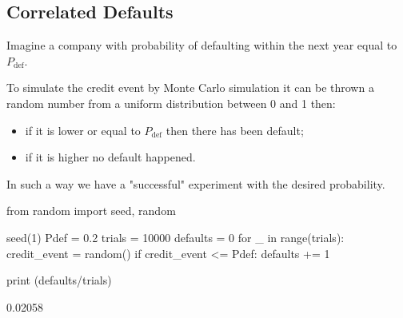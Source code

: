 



    


\subsection{Correlated Defaults}

Imagine a company with probability of defaulting within the next year equal to $P_{\mathrm{def}}$.

To simulate the credit event by Monte Carlo simulation it can be thrown a random number from a uniform distribution between 0 and 1  then:
\begin{itemize}
\item if it is lower or equal to $P_{\mathrm{def}}$ then there has been default;
\item if it is higher no default happened.
\end{itemize}

In such a way we have a "successful" experiment with the desired probability.

\begin{ipython}
from random import seed, random

seed(1)
Pdef = 0.2
trials = 10000
defaults = 0
for _ in range(trials):
    credit_event = random()
    if credit_event <= Pdef:
        defaults += 1

print (defaults/trials)
\end{ipython}
\begin{ioutput}
0.02058
\end{ioutput}

